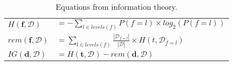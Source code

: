 \documentclass[--SOLUTION-OPTION--]{ditpaper}
\begin{document}
\begin{table}[!hb]
		\renewcommand{\arraystretch}{2}
	\begin{center}
		\caption{Equations from information theory.}
		\label{tab:info-eqs}
			\begin{tabular}{ll}
		\hline
		$H(\mathbf{f}, \mathcal{D})$ & $= -\displaystyle\sum_{l \in levels(f)} P(f=l) \times log_2(P(f=l))$\\
		$rem(\mathbf{f}, \mathcal{D})$ & $=\displaystyle\sum_{l \in levels(f)} \frac{|\mathcal{D}_{f=l}|}{|\mathcal{D}|} \times H(t, \mathcal{D}_{f=l})$\\
		$IG(\mathbf{d},\mathcal{D})$ & $=H(\mathbf{t}, \mathcal{D})-rem(\mathbf{d}, \mathcal{D})$\\
		\hline
	\end{tabular}
	\end{center}
\end{table}


\clearpage
\newpage

\end{document}
